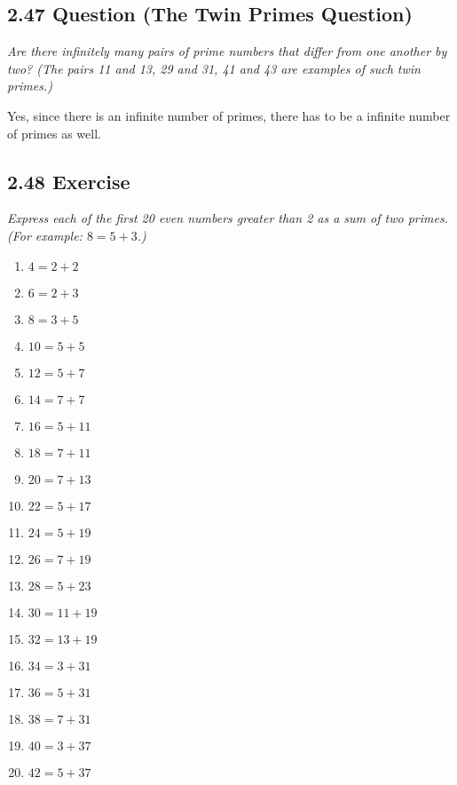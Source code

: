 \documentclass{article}
\begin{document}
\subsection*{2.47 Question (The Twin Primes Question)}
\quad \textit{Are there infinitely many pairs of prime numbers that differ from one another by two? (The pairs 11 and 13, 29 and 31, 41 and 43 are examples of such twin primes.)}

Yes, since there is an infinite number of primes, there has to be a infinite number of primes as well.

\subsection*{2.48 Exercise} 
\quad \textit{Express each of the first 20 even numbers greater than 2 as a sum of two primes. (For example: $8 = 5+3$.)}

\begin{enumerate}
    \item $4 = 2 + 2$
    \item $6 = 2 + 3$
    \item $8 = 3 + 5$
    \item $10 = 5 + 5$
    \item $12 = 5 + 7$
    \item $14 = 7 + 7$
    \item $16 = 5 + 11$
    \item $18 = 7 + 11$
    \item $20 = 7 + 13$
    \item $22 = 5 + 17$
    \item $24 = 5 + 19$
    \item $26 = 7 + 19$
    \item $28 = 5 + 23$
    \item $30 = 11 + 19$
    \item $32 = 13 + 19$
    \item $34 = 3 + 31$
    \item $36 = 5 + 31$
    \item $38 = 7 + 31$
    \item $40 = 3 + 37$
    \item $42 = 5 + 37$
\end{enumerate}
\end{document}
